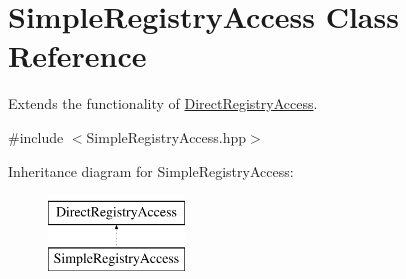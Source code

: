 \hypertarget{class_simple_registry_access}{}\section{Simple\+Registry\+Access Class Reference}
\label{class_simple_registry_access}


Extends the functionality of \hyperlink{class_direct_registry_access}{Direct\+Registry\+Access}.  




{\ttfamily \#include $<$Simple\+Registry\+Access.\+hpp$>$}

Inheritance diagram for Simple\+Registry\+Access\+:\begin{figure}[H]
\begin{center}
\leavevmode
\includegraphics[height=2.000000cm]{class_simple_registry_access}
\end{center}
\end{figure}
